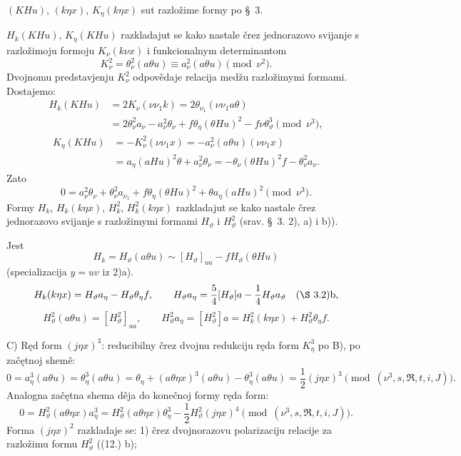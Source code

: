 \documentclass[11pt]{article}
\newcommand{\R}{\mathfrak R}
\begin{document}
$(KHu)$, $(k\eta x)$, $K_\eta(k\eta x)$ sut razložime formy po \S\ 3.

$H_k(KHu)$, $K_\eta(KHu)$ razkladajut se kako nastale črez jednorazovo svijanje s razložimoju formoju $K_\nu(k\nu x)$ i funkcionalnym determinantom
\[
K_\nu^2=\theta_\nu^2(a\theta u)\equiv a_\nu^2(a\theta u)\pmod{\nu^2}.
\]
Dvojnomu predstavjenju $K_\nu^2$ odpovědaje relacija medžu razložimymi formami. Dostajemo:
\[
\begin{aligned}
H_k(KHu)&=2K_\nu(\nu\nu_1k)=2\theta_{\nu_1}(\nu\nu_1a\theta)\\
&=2\theta_\nu^2a_\nu-a_\nu^2\theta_\nu
+f\theta_\eta(\theta Hu)^2-f\nu\theta_\vartheta^3
\pmod{\nu^3},
\end{aligned}
\]
\[
\begin{aligned}
K_\eta(KHu)&=-K_\nu^2(\nu\nu_1x)
=-a_\nu^2(a\theta u)(\nu\nu_1x)\\
&=a_\eta(aHu)^2\theta+a_\nu^2\theta_\nu
=-\theta_\nu(\theta Hu)^2f-\theta_\nu^2a_\nu.
\end{aligned}
\]
Zato
\[
\tag{17}
0=a_\nu^2\theta_\nu+\theta_\nu^2a_{\nu_1}
+f\theta_\eta(\theta Hu)^2+\theta a_\eta(aHu)^2\pmod{\nu^3}.
\]
Formy $H_k$, $H_k(k\eta x)$, $H_k^2$, $H_k^2(k\eta x)$ razkladajut se kako nastale črez jednorazovo svijanje s razložimymi formami $H_\vartheta$ i $H_\vartheta^2$ (srav. \S\ 3. 2), \mbox{a)} i \mbox{b)}).

Jest
\[
H_k=H_\vartheta(a\theta u)\sim [H_\vartheta]_{ua}-fH_\vartheta(\theta Hu)
\]
(specializacija $y=uv$ iz 2)\mbox{a}).
\[
H_k(k\eta x)=H_\vartheta a_\eta-H_\vartheta\theta_\eta f,
\qquad
H_\vartheta a_\eta=\frac54[H_\vartheta]a-\frac14H_\vartheta a_\vartheta
\quad(\S\ 3. 2)\mbox{b},
\]
\[
H_\vartheta^2(a\theta u)=[H_\vartheta^2]_{ua},
\qquad
H_\vartheta^2a_\eta=[H_\vartheta^2]a=H_k^2(k\eta x)+H_\vartheta^2\theta_\eta f.
\]

\noindent\mbox{C)} Ręd form $(j\eta x)^3$: reducibilny črez dvojnu redukciju ręda form $K_\eta^3$ po \mbox{B)}, po začętnoj shemě:
\[
0=a_\eta^3(a\theta u)=\theta_\eta^3(a\theta u)
=\theta_\eta+(a\theta\eta x)^3(a\theta u)-\theta_\eta^3(a\theta u)
=\frac12(j\eta x)^3\pmod{(\nu^3,s,\R,t,i,J)}.
\]
Analogna začętna shema děja do konečnoj formy ręda form:
\[
0=H_\vartheta^2(a\theta\eta x)a_\eta^3
=H_\vartheta^2(a\theta\eta x)\theta_\eta^3
-\frac12H_\vartheta^2(j\eta x)^4\pmod{(\nu^3,s,\R,t,i,J)}.
\]
Forma $(j\eta x)^2$ razkladaje se: 1) črez dvojnorazovu polarizaciju relacije za razložimu formu $H_\vartheta^2$ ((12.) \mbox{b});
\end{document}
